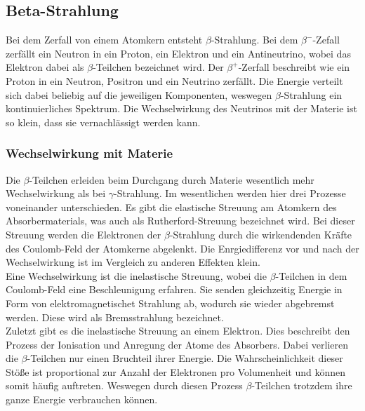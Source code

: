\subsection{Beta-Strahlung} %
\label{sub:Beta-Strahlung}
Bei dem Zerfall von einem Atomkern entsteht $\beta$-Strahlung. Bei dem $\beta^-$-Zefall zerfällt ein Neutron in ein Proton, 
ein Elektron und ein Antineutrino, wobei das Elektron dabei als $\beta$-Teilchen bezeichnet wird.
Der $\beta^+$-Zerfall beschreibt wie ein Proton in ein Neutron, Positron und ein Neutrino zerfällt.
Die Energie verteilt sich dabei beliebig auf die jeweiligen Komponenten, weswegen $\beta$-Strahlung ein kontinuierliches Spektrum.
Die Wechselwirkung des Neutrinos mit der Materie ist so klein, dass sie vernachlässigt werden kann.

\subsubsection{Wechselwirkung mit Materie}
\label{subsub: WeMaB}
Die $\beta$-Teilchen erleiden beim Durchgang durch Materie wesentlich mehr Wechselwirkung als bei $\gamma$-Strahlung.
Im wesentlichen werden hier drei Prozesse voneinander unterschieden.
Es gibt die elastische Streuung am Atomkern des Absorbermaterials, was auch als Rutherford-Streuung bezeichnet wird.
Bei dieser Streuung werden die Elektronen der $\beta$-Strahlung durch die wirkendenden Kräfte des Coulomb-Feld der Atomkerne abgelenkt.
Die Enrgiedifferenz vor und nach der Wechselwirkung ist im Vergleich zu anderen Effekten klein.\\
Eine Wechselwirkung ist die inelastische Streuung, wobei die $\beta$-Teilchen in dem Coulomb-Feld eine Beschleunigung erfahren.
Sie senden gleichzeitig Energie in Form von elektromagnetischet Strahlung ab, wodurch sie wieder abgebremst werden.
Diese wird als Bremsstrahlung bezeichnet.\\
Zuletzt gibt es die inelastische Streuung an einem Elektron.
Dies beschreibt den Prozess der Ionisation und Anregung der Atome des Absorbers. Dabei verlieren die $\beta$-Teilchen nur einen Bruchteil
ihrer Energie. Die Wahrscheinlichkeit dieser Stöße ist proportional zur Anzahl der Elektronen pro Volumenheit und können somit häufig auftreten.
Weswegen durch diesen Prozess $\beta$-Teilchen trotzdem ihre ganze Energie verbrauchen können.\\

